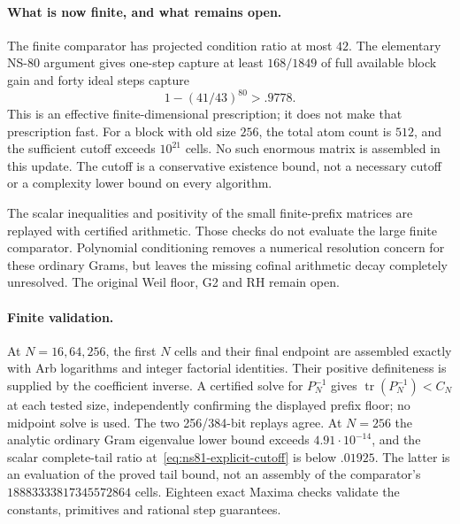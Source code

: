 \paragraph{What is now finite, and what remains open.}
The finite comparator has projected condition ratio at most $42$.
The elementary NS-80 argument gives one-step capture at least
$168/1849$ of full available block gain and forty ideal steps capture
\[
 1-(41/43)^{80}>.9778.
\]
This is an effective finite-dimensional prescription; it does not make
that prescription fast. For a block with old size $256$, the total atom
count is $512$, and the sufficient cutoff exceeds $10^{21}$ cells.
No such enormous matrix is assembled in this update. The cutoff is a
conservative existence bound, not a necessary cutoff or a complexity
lower bound on every algorithm.

The scalar inequalities and positivity of the small finite-prefix matrices
are replayed with certified arithmetic. Those checks do not evaluate the
large finite comparator. Polynomial conditioning removes a numerical
resolution concern for these ordinary Grams, but leaves the missing
cofinal arithmetic decay completely unresolved. The original Weil floor,
G2 and RH remain open.

\paragraph{Finite validation.}
At $N=16,64,256$, the first $N$ cells and their final endpoint are
assembled exactly with Arb logarithms and integer factorial identities.
Their positive definiteness is supplied by the coefficient inverse.
A certified solve for $P_N^{-1}$ gives
$\operatorname{tr}(P_N^{-1})<C_N$ at each tested size, independently
confirming the displayed prefix floor; no midpoint solve is used.
The two 256/384-bit replays agree. At $N=256$ the analytic ordinary
Gram eigenvalue lower bound exceeds $4.91\cdot10^{-14}$, and the scalar
complete-tail ratio at~\eqref{eq:ns81-explicit-cutoff} is below $.01925$.
The latter is an evaluation of the proved tail bound, not an assembly
of the comparator's $18883333817345572864$ cells. Eighteen exact Maxima
checks validate the constants, primitives and rational step guarantees.
